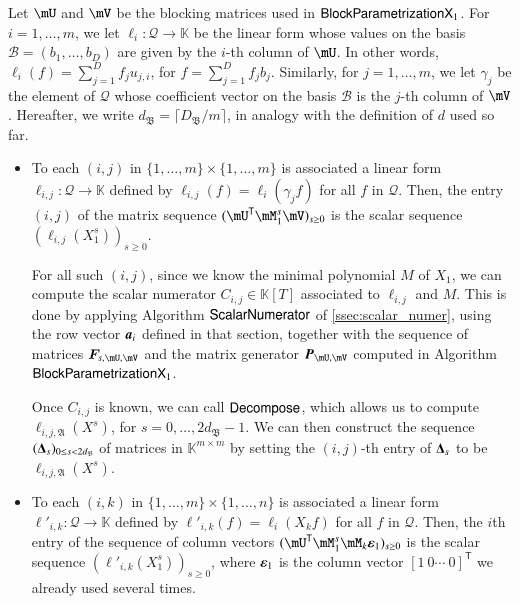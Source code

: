 \documentclass[final,1p,times,authoryear]{elsarticle}
\newcommand{\mat}[1]{\bm{\MakeUppercase{#1}}} %
\newcommand{\row}[1]{\bm{\MakeLowercase{#1}}} %
\newcommand{\col}[1]{\bm{\MakeLowercase{#1}}} %
\newcommand{\seqelt}[1]{\bm{F}_{#1}} %
\newcommand{\basis}{\mathscr{B}}
\newcommand{\mainalgoname}{\mathsf{ BlockParametrization}}
\newcommand{\lf}{X}
\newcommand{\residueI}{\mathscr{Q}}
\newcommand{\trsp}[1]{#1^{\mathsf{T}}} %
\def\K{\mathbb{K}}
\def\K {\ensuremath{\mathbb{K}}}
\newcommand{\mUt}{\trsp{\mU}}
\begin{document}
Let $\mU$ and $\mV$ be the blocking matrices used in
$\mainalgoname{\sf X}_1$. For $i=1,\dots,m$, we let
$\ell_i: \residueI \to \K$ be the linear form whose values on the
basis $\basis=(b_1,\dots,b_D)$ are given by the $i$-th column of
$\mU$. In other words, $\ell_i(f) = \sum_{j=1}^D f_j u_{j,i}$, for
$f=\sum_{j=1}^D f_j b_j$. Similarly, for $j=1,\dots,m$, we let
$\gamma_j$ be the element of $\residueI$ whose coefficient vector on
the basis $\basis$ is the $j$-th column of $\mV$.
Hereafter, we write $d_\mathfrak{B}=\lceil D_\mathfrak{B}/m \rceil$,
in analogy with the definition of $d$ used so far.
\begin{itemize}
  \item To each $(i,j)$ in $\{1,\dots,m\}\times \{1,\dots,m\}$ is
    associated a linear form $\ell_{i,j}: \residueI\to \K$ defined by
    $\ell_{i,j}(f) =\ell_i(\gamma_j f)$ for all $f$ in $\residueI$.
    Then, the entry $(i,j)$ of the matrix sequence $(\mUt \mM_1^s
    \mV)_{s \ge0}$ is the scalar sequence $(\ell_{i,j}(X_1^s))_{s \ge
    0}$.

    \smallskip

    For all such $(i,j)$, since we know the minimal polynomial $M$ of
    $X_1$, we can compute the scalar numerator $C_{i,j} \in \K[T]$
    associated to $\ell_{i,j}$ and $M$. This is done by applying
    Algorithm $\mathsf{{\sf ScalarNumerator}}$ of
    \cref{ssec:scalar_numer}, using the row vector $\row{a}_i$ defined
    in that section, together with the sequence of matrices
    $\seqelt{s,\mU,\mV}$ and the matrix generator $\mat{P}_{\mU,\mV}$
    computed in Algorithm $\mainalgoname{\sf X}_1$.

    \smallskip

    Once $C_{i,j}$ is known, we can call ${\sf Decompose}$, which allows us
    to compute $\ell_{i,j,\mathfrak{A}}(\lf^s)$, for
    $s=0,\dots,2d_\mathfrak{B}-1$.  We can then construct the sequence
    $(\mat{\Delta}_s)_{0 \le s < 2d_\mathfrak{B}}$ of matrices in
    $\K^{m\times m}$ by setting the $(i,j)$-th entry of $\mat{\Delta}_s$
    to be $\ell_{i,j,\mathfrak{A}}(\lf^s)$.

    \smallskip

  \item To each $(i,k)$ in $\{1,\dots,m\}\times \{1,\dots,n\}$ is
    associated a linear form $\ell'_{i,k}: \residueI\to \K$ defined by
    $\ell'_{i,k}(f) =\ell_i(X_k f)$ for all $f$ in $\residueI$.  Then,
    the $i$th entry of the sequence of column vectors $(\mUt
    \mM_1^s \mM_k \col{\varepsilon}_1)_{s \ge0}$ is the scalar sequence
    $(\ell'_{i,k}(X_1^s))_{s \ge 0}$, where $\col{\varepsilon}_1$ is the
    column vector $\trsp{[1~0\cdots~0]}$ we already used several times.


\end{itemize}
\end{document}
